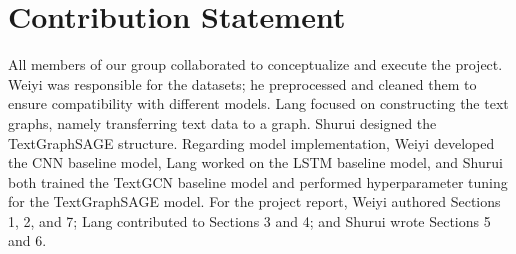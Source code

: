 \documentclass{article}
\begin{document}
\newpage
\section{Contribution Statement}

All members of our group collaborated to conceptualize and execute the project. Weiyi was responsible for the datasets; he preprocessed and cleaned them to ensure compatibility with different models. Lang focused on constructing the text graphs, namely transferring text data to a graph. Shurui designed the TextGraphSAGE structure. Regarding model implementation, Weiyi developed the CNN baseline model, Lang worked on the LSTM baseline model, and Shurui both trained the TextGCN baseline model and performed hyperparameter tuning for the TextGraphSAGE model. For the project report, Weiyi authored Sections 1, 2, and 7; Lang contributed to Sections 3 and 4; and Shurui wrote Sections 5 and 6.


\small

\newpage



\end{document}
